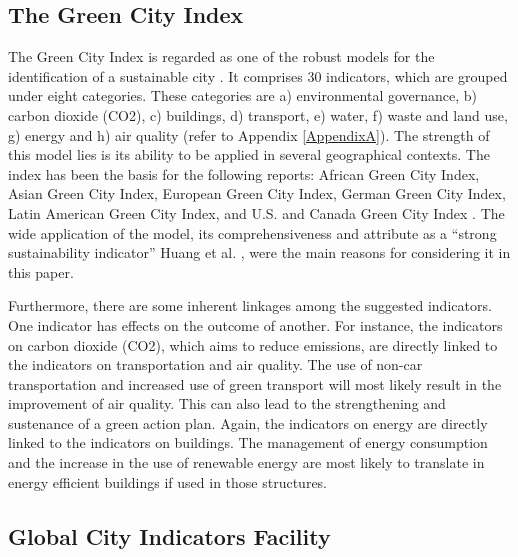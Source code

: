 \subsection{The Green City Index}

The Green City Index is regarded as one of the robust models for the identification of a sustainable city \cite{Huang2015}. It comprises 30 indicators, which are grouped under eight categories. These categories are a) environmental governance, b) carbon dioxide (CO2), c) buildings, d) transport, e) water, f) waste and land use, g) energy and h) air quality (refer to Appendix \ref{AppendixA}). The strength of this model lies is its ability to be applied in several geographical contexts. The index has been the basis for the following reports: African Green City Index, Asian Green City Index, European Green City Index, German Green City Index, Latin American Green City Index, and U.S. and Canada Green City Index \cite{Huang2015}. The wide application of the model, its comprehensiveness and attribute as a “strong sustainability indicator” Huang et al. \cite{Huang2015}, were the main reasons for considering it in this paper.

Furthermore, there are some inherent linkages among the suggested indicators. One indicator has effects on the outcome of another. For instance, the indicators on carbon dioxide (CO2), which aims to reduce emissions, are directly linked to the indicators on transportation and air quality. The use of non-car transportation and increased use of green transport will most likely result in the improvement of air quality. This can also lead to the strengthening and sustenance of a green action plan. Again, the indicators on energy are directly linked to the indicators on buildings. The management of energy consumption and the increase in the use of renewable energy are most likely to translate in energy efficient buildings if used in those structures.

\subsection{Global City Indicators Facility}

